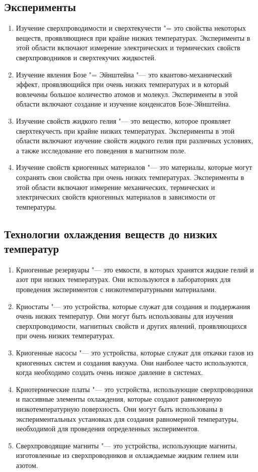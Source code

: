 \documentclass[bachelor,och,referat]{SCWorks_corrected}
\begin{document}
\subsection{Эксперименты}\begin{enumerate}
    \item Изучение сверхпроводимости и сверхтекучести "= это свойства некоторых веществ, проявляющиеся при крайне низких температурах. Эксперименты в этой области включают измерение электрических и термических свойств сверхпроводников и сверхтекучих жидкостей.
    \item Изучение явления Бозе "= Эйнштейна "--- это квантово-механический эффект, проявляющийся при очень низких температурах и в который вовлечены большое количество атомов и молекул. Эксперименты в этой области включают создание и изучение конденсатов Бозе-Эйнштейна.
    \item Изучение свойств жидкого гелия "--- это вещество, которое проявляет сверхтекучесть при крайне низких температурах. Эксперименты в этой области включают изучение свойств жидкого гелия при различных условиях, а также исследование его поведения в магнитном поле.
    \item Изучение свойств криогенных материалов "--- это материалы, которые могут сохранять свои свойства при очень низких температурах. Эксперименты в этой области включают измерение механических, термических и электрических свойств криогенных материалов в зависимости от температуры.
\end{enumerate}

\subsection{Технологии охлаждения веществ до низких температур}\begin{enumerate}
    \item Криогенные резервуары "--- это емкости, в которых хранятся жидкие гелий и азот при низких температурах. Они используются в лабораториях для проведения экспериментов с низкотемпературными материалами.
    \item Криостаты "--- это устройства, которые служат для создания и поддержания очень низких температур. Они могут быть использованы для изучения сверхпроводимости, магнитных свойств и других явлений, проявляющихся при очень низких температурах. 
    \item Криогенные насосы "--- это устройства, которые служат для откачки газов из криогенных систем и создания вакуума. Они наиболее часто используются, когда необходимо создать очень низкое давление в системах. 
    \item Криотермические платы "--- это устройства, использующие сверхпроводники и пассивные элементы охлаждения, которые создают равномерную низкотемпературную поверхность. Они могут быть использованы в экспериментальных установках для создания равномерной температуры, необходимой для проведения определенных экспериментов. 
    \item Сверхпроводящие магниты "--- это устройства, использующие магниты, изготовленные из сверхпроводников и охлаждаемые жидким гелием или азотом. 
\end{enumerate}
\end{document}
